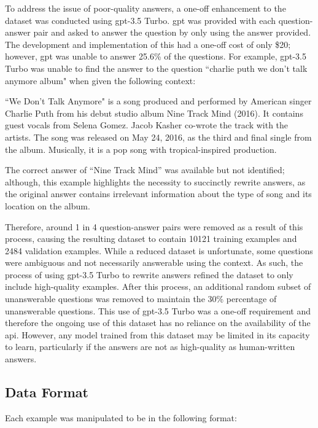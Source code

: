 To address the issue of poor-quality answers, a one-off enhancement to the dataset was conducted using \acrshort{gpt}-3.5 Turbo. \acrshort{gpt} was provided with each question-answer pair and asked to answer the question by only using the answer provided. The development and implementation of this had a one-off cost of only \$20; however, \acrshort{gpt} was unable to answer 25.6\% of the questions. For example, \acrshort{gpt}-3.5 Turbo was unable to find the answer to the question ``charlie puth we don't talk anymore album" when given the following context:

\begin{itquote}
    ``We Don't Talk Anymore" is a song produced and performed by American singer Charlie Puth from his debut studio album Nine Track Mind (2016). It contains guest vocals from Selena Gomez. Jacob Kasher co-wrote the track with the artists. The song was released on May 24, 2016, as the third and final single from the album. Musically, it is a pop song with tropical-inspired production.
\end{itquote}

The correct answer of ``Nine Track Mind'' was available but not identified; although, this example highlights the necessity to succinctly rewrite answers, as the original answer contains irrelevant information about the type of song and its location on the album.

Therefore, around 1 in 4 question-answer pairs were removed as a result of this process, causing the resulting dataset to contain 10121 training examples and 2484 validation examples. While a reduced dataset is unfortunate, some questions were ambiguous and not necessarily answerable using the context. As such, the process of using \acrshort{gpt}-3.5 Turbo to rewrite answers refined the dataset to only include high-quality examples. After this process, an additional random subset of unanswerable questions was removed to maintain the 30\% percentage of unanswerable questions. This use of \acrshort{gpt}-3.5 Turbo was a one-off requirement and therefore the ongoing use of this dataset has no reliance on the availability of the \acrshort{api}. However, any model trained from this dataset may be limited in its capacity to learn, particularly if the answers are not as high-quality as human-written answers.


\subsection{Data Format}
Each example was manipulated to be in the following format:

